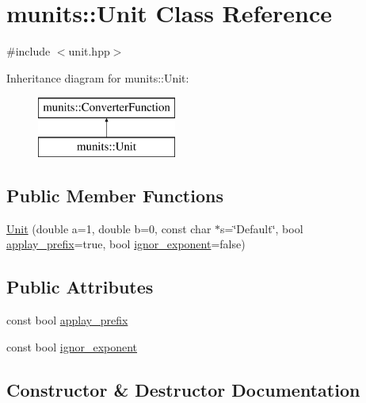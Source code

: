 \hypertarget{classmunits_1_1_unit}{}\section{munits\+:\+:Unit Class Reference}
\label{classmunits_1_1_unit}


{\ttfamily \#include $<$unit.\+hpp$>$}

Inheritance diagram for munits\+:\+:Unit\+:\begin{figure}[H]
\begin{center}
\leavevmode
\includegraphics[height=2.000000cm]{classmunits_1_1_unit}
\end{center}
\end{figure}
\subsection*{Public Member Functions}
\begin{DoxyCompactItemize}
\item 
\hyperlink{classmunits_1_1_unit_a5e21dcab6e2e796ef1685c2c7ec70222}{Unit} (double a=1, double b=0, const char $\ast$s=\char`\"{}Default\char`\"{}, bool \hyperlink{classmunits_1_1_unit_a83a409eaa2d8bcb5940d90488f41bfbf}{applay\+\_\+prefix}=true, bool \hyperlink{classmunits_1_1_unit_a52145682ed514d15c6a79e0f6d9c2c90}{ignor\+\_\+exponent}=false)
\end{DoxyCompactItemize}
\subsection*{Public Attributes}
\begin{DoxyCompactItemize}
\item 
const bool \hyperlink{classmunits_1_1_unit_a83a409eaa2d8bcb5940d90488f41bfbf}{applay\+\_\+prefix}
\item 
const bool \hyperlink{classmunits_1_1_unit_a52145682ed514d15c6a79e0f6d9c2c90}{ignor\+\_\+exponent}
\end{DoxyCompactItemize}


\subsection{Constructor \& Destructor Documentation}
\mbox{\label{classmunits_1_1_unit_a5e21dcab6e2e796ef1685c2c7ec70222}} 
